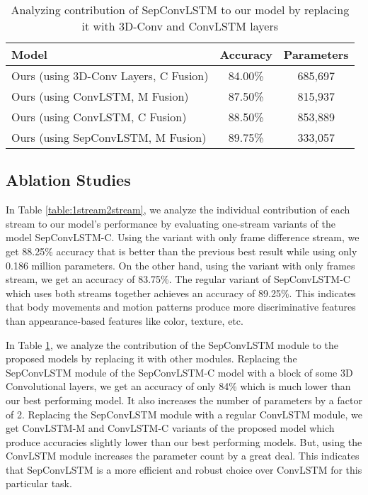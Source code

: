 \documentclass[conference]{IEEEtran}
\begin{document}
\begin{table}[t]
\centering
\caption{Analyzing contribution of SepConvLSTM to our model by replacing it with 3D-Conv and ConvLSTM layers}
\label{table:3dconvConvLSTM}
\begin{tabular}{lcc}
\hline
\textbf{Model}                  & \textbf{Accuracy} & \textbf{Parameters}  \\ \hline
Ours (using 3D-Conv Layers, C Fusion)        & 84.00\%           & 685,697             \\
Ours (using ConvLSTM, M Fusion)   & 87.50\%           & 815,937             \\
Ours (using ConvLSTM, C Fusion)       & 88.50\%           & 853,889             \\
Ours (using SepConvLSTM, M Fusion)       & 89.75\%           &  333,057             \\ \hline
\end{tabular}
\end{table}


\subsection{Ablation Studies}

In Table \ref{table:1stream2stream}, we analyze the individual contribution of each stream to our model's performance by evaluating one-stream variants of the model SepConvLSTM-C. Using the variant with only frame difference stream, we get 88.25\% accuracy that is better than the previous best result while using only 0.186 million parameters. On the other hand, using the variant with only frames stream, we get an accuracy of 83.75\%. The regular variant of SepConvLSTM-C which uses both streams together achieves an accuracy of 89.25\%. This indicates that body movements and motion patterns produce more discriminative features than appearance-based features like color, texture, etc.

In Table \ref{table:3dconvConvLSTM}, we analyze the contribution of the SepConvLSTM module to the proposed models by replacing it with other modules. Replacing the SepConvLSTM module of the SepConvLSTM-C model with a block of some 3D Convolutional layers, we get an accuracy of only 84\% which is much lower than our best performing model. It also increases the number of parameters by a factor of 2. Replacing the SepConvLSTM module with a regular ConvLSTM module, we get ConvLSTM-M and ConvLSTM-C variants of the proposed model which produce accuracies slightly lower than our best performing models. But, using the ConvLSTM module increases the parameter count by a great deal. This indicates that SepConvLSTM is a more efficient and robust choice over ConvLSTM for this particular task.
\end{document}
